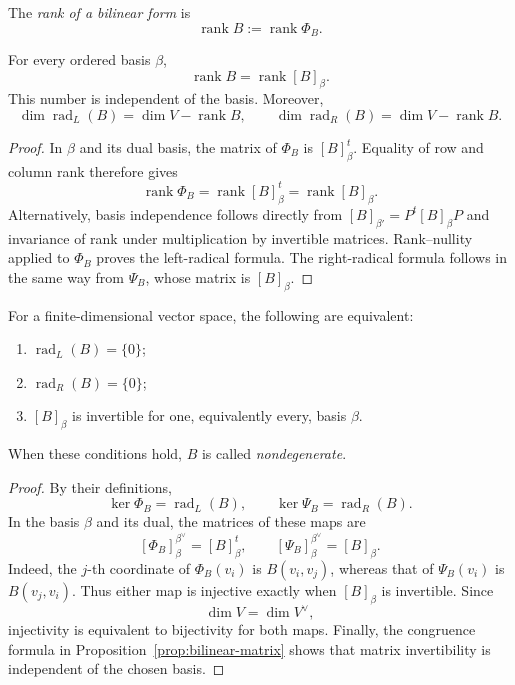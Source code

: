 \begin{definition}
The \emph{rank of a bilinear form} is
\[
\operatorname{rank}B:=\operatorname{rank}\Phi_B.
\]
\end{definition}

\begin{proposition}
For every ordered basis \(\beta\),
\[
\operatorname{rank}B=\operatorname{rank}[B]_\beta.
\]
This number is independent of the basis.  Moreover,
\[
\dim\operatorname{rad}_L(B)=\dim V-\operatorname{rank}B,
\qquad
\dim\operatorname{rad}_R(B)=\dim V-\operatorname{rank}B.
\]
\end{proposition}
\begin{proof}
In \(\beta\) and its dual basis, the matrix of \(\Phi_B\) is
\([B]_\beta^t\).  Equality of row and column rank therefore gives
\[
\operatorname{rank}\Phi_B
=\operatorname{rank}[B]_\beta^t
=\operatorname{rank}[B]_\beta.
\]
Alternatively, basis independence follows directly from
\([B]_{\beta'}=P^t[B]_\beta P\) and invariance of rank under multiplication
by invertible matrices.  Rank--nullity applied to \(\Phi_B\) proves the
left-radical formula.  The right-radical formula follows in the same way from
\(\Psi_B\), whose matrix is \([B]_\beta\).
\end{proof}

\begin{proposition}
For a finite-dimensional vector space, the following are equivalent:
\begin{enumerate}
\item \(\operatorname{rad}_L(B)=\{0\}\);
\item \(\operatorname{rad}_R(B)=\{0\}\);
\item \([B]_\beta\) is invertible for one, equivalently every, basis
\(\beta\).
\end{enumerate}
When these conditions hold, \(B\) is called \emph{nondegenerate}.
\end{proposition}
\begin{proof}
By their definitions,
\[
\ker\Phi_B=\operatorname{rad}_L(B),
\qquad
\ker\Psi_B=\operatorname{rad}_R(B).
\]
In the basis \(\beta\) and its dual, the matrices of these maps are
\[
[\Phi_B]_{\beta}^{\beta^\vee}=[B]_\beta^t,
\qquad
[\Psi_B]_{\beta}^{\beta^\vee}=[B]_\beta.
\]
Indeed, the \(j\)-th coordinate of \(\Phi_B(v_i)\) is \(B(v_i,v_j)\),
whereas that of \(\Psi_B(v_i)\) is \(B(v_j,v_i)\).  Thus either map is
injective exactly when \([B]_\beta\) is invertible.  Since
\[
\dim V=\dim V^\vee,
\]
injectivity is equivalent to bijectivity for both maps.  Finally, the
congruence formula in Proposition~\ref{prop:bilinear-matrix} shows that
matrix invertibility is independent of the chosen basis.
\end{proof}

